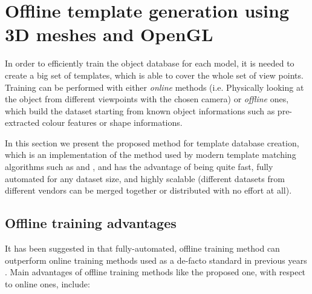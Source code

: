 \section{Offline template generation using 3D meshes and OpenGL}
In order to efficiently train the object database for each model, it is needed
to create a big set of templates, which is able to cover the whole set of view
points. Training can be performed with either \emph{online} methods (i.e.
Physically looking at the object from different viewpoints with the chosen
camera) or \emph{offline} ones, which build the dataset starting from known
object informations such as pre-extracted colour features or shape informations.

In this section we present the proposed method for template database
creation, which is an implementation of the method used by modern template
matching algorithms such as \cite{linemod-paper} and \cite{TODO}, and
has the advantage of being quite fast, fully automated for any dataset size,
and highly scalable (different datasets from different vendors can be merged
together or distributed with no effort at all).

\subsection{Offline training advantages}
It has been suggested in \cite{TODO} that fully-automated, offline training method can
outperform online training methods used as a de-facto standard
in previous years \cite{TODO}. Main advantages of offline training methods like
the proposed one, with respect
to online ones, include:

